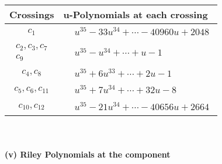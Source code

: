 \documentclass[1p]{elsarticle_modified}
\theoremstyle{definition}
\begin{document}
\begin{tabular}{m{50pt}|m{274pt}}
Crossings & \hspace{64pt}u-Polynomials at each crossing \\
\hline $$\begin{aligned}c_{1}\end{aligned}$$&$\begin{aligned}
&u^{35}-33 u^{34}+\cdots-40960 u+2048
\end{aligned}$\\
\hline $$\begin{aligned}c_{2},c_{3},c_{7}\\c_{9}\end{aligned}$$&$\begin{aligned}
&u^{35}- u^{34}+\cdots+u-1
\end{aligned}$\\
\hline $$\begin{aligned}c_{4},c_{8}\end{aligned}$$&$\begin{aligned}
&u^{35}+6 u^{33}+\cdots+2 u-1
\end{aligned}$\\
\hline $$\begin{aligned}c_{5},c_{6},c_{11}\end{aligned}$$&$\begin{aligned}
&u^{35}+7 u^{34}+\cdots+32 u-8
\end{aligned}$\\
\hline $$\begin{aligned}c_{10},c_{12}\end{aligned}$$&$\begin{aligned}
&u^{35}-21 u^{34}+\cdots-40656 u+2664
\end{aligned}$\\
\hline
\end{tabular}\\~\\
\newpage\renewcommand{\arraystretch}{1}
\flushleft \textbf{(v) Riley Polynomials at the component}\newline \\
\end{document}
